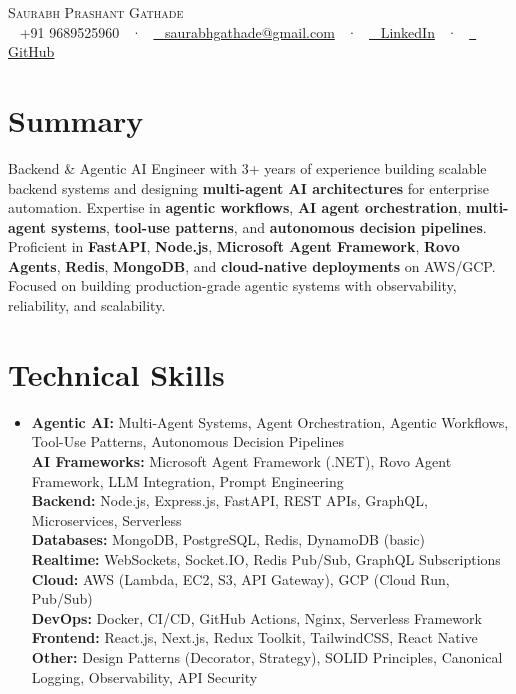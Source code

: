 \documentclass[letterpaper,11pt]{article}
\newcommand{\resumeSubHeadingListStart}{\begin{itemize}[leftmargin=0in,label={}]}
\newcommand{\resumeSubHeadingListEnd}{\end{itemize}}
\begin{document}
\begin{center}
{\Huge \scshape Saurabh Prashant Gathade} \\ \vspace{4pt}
\small
\faPhone~ +91 9689525960 ~·~
\href{mailto:saurabhgathade@gmail.com}{\faEnvelope~ saurabhgathade@gmail.com} ~·~
\href{https://www.linkedin.com/in/saurabhpgathade}{\faLinkedin~ LinkedIn} ~·~
\href{https://github.com/Saurabhgathade131}{\faGithub~ GitHub}
\end{center}

\section{Summary}
\small Backend \& Agentic AI Engineer with 3+ years of experience building scalable backend systems and designing \textbf{multi-agent AI architectures} for enterprise automation. Expertise in \textbf{agentic workflows}, \textbf{AI agent orchestration}, \textbf{multi-agent systems}, \textbf{tool-use patterns}, and \textbf{autonomous decision pipelines}. Proficient in \textbf{FastAPI}, \textbf{Node.js}, \textbf{Microsoft Agent Framework}, \textbf{Rovo Agents}, \textbf{Redis}, \textbf{MongoDB}, and \textbf{cloud-native deployments} on AWS/GCP. Focused on building production-grade agentic systems with observability, reliability, and scalability.

\section{Technical Skills}
\resumeSubHeadingListStart
\item\small{
\textbf{Agentic AI:} Multi-Agent Systems, Agent Orchestration, Agentic Workflows, Tool-Use Patterns, Autonomous Decision Pipelines \\
\textbf{AI Frameworks:} Microsoft Agent Framework (.NET), Rovo Agent Framework, LLM Integration, Prompt Engineering \\
\textbf{Backend:} Node.js, Express.js, FastAPI, REST APIs, GraphQL, Microservices, Serverless \\
\textbf{Databases:} MongoDB, PostgreSQL, Redis, DynamoDB (basic) \\
\textbf{Realtime:} WebSockets, Socket.IO, Redis Pub/Sub, GraphQL Subscriptions \\
\textbf{Cloud:} AWS (Lambda, EC2, S3, API Gateway), GCP (Cloud Run, Pub/Sub) \\
\textbf{DevOps:} Docker, CI/CD, GitHub Actions, Nginx, Serverless Framework \\
\textbf{Frontend:} React.js, Next.js, Redux Toolkit, TailwindCSS, React Native \\
\textbf{Other:} Design Patterns (Decorator, Strategy), SOLID Principles, Canonical Logging, Observability, API Security
}
\resumeSubHeadingListEnd
\vspace{-10pt}
\end{document}

